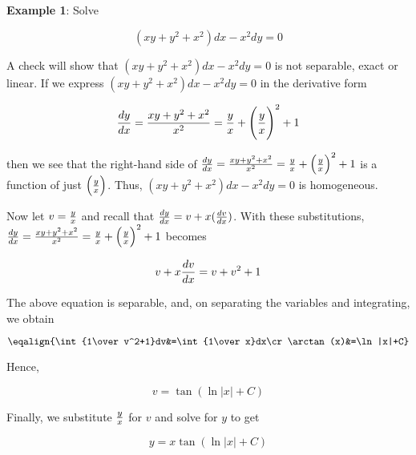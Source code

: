 \nopagenumbers
{\bf Example 1}: Solve

$$(xy+y^2+x^2)dx-x^2dy=0$$

\vskip 6pt
A check will show that $(xy+y^2+x^2)dx-x^2dy=0$ is not separable, exact or linear. If we express $(xy+y^2+x^2)dx-x^2dy=0$ in the derivative form

$${dy\over dx}={xy+y^2+x^2\over x^2}={y\over x}+\Biggl({y\over x}\Biggr)^2+1$$

then we see that the right-hand side of ${dy\over dx}={xy+y^2+x^2\over x^2}={y\over x}+\Bigl({y\over x}\Bigr)^2+1$ is a function of just $\Bigl({y\over x}\Bigr)$. Thus, $(xy+y^2+x^2)dx-x^2dy=0$ is homogeneous.

\vskip 1mm
Now let $v={y\over x}$  and recall that ${dy\over dx}=v+x({dv\over dx})$. With these substitutions, ${dy\over dx}={xy+y^2+x^2\over x^2}={y\over x}+\Bigl({y\over x}\Bigr)^2+1$ becomes

$$v+x{dv\over dx}=v+v^2+1$$

The above equation is separable, and, on separating the variables and integrating, we obtain

$$\eqalign{\int{1\over v^2+1}dv&=\int{1\over x}dx\cr
	\arctan(x)&=\ln|x|+C}$$

Hence,

$$v=\tan(\ln|x|+C)$$

Finally, we substitute ${y\over x}$ for $v$ and solve for $y$ to get

$$y=x\tan(\ln|x|+C)$$

\vfill\eject
\bye
